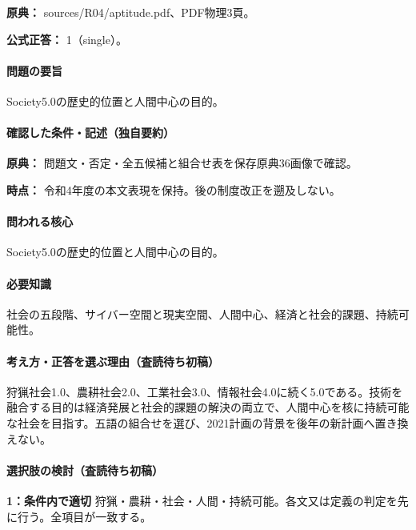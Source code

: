 \noindent\textbf{原典：} sources/R04/aptitude.pdf、PDF物理3頁。

\textbf{公式正答：} 1（single）。

\paragraph{問題の要旨} Society5.0の歴史的位置と人間中心の目的。

\paragraph{確認した条件・記述（独自要約）}\mbox{}\par

\noindent\textbf{原典：} 問題文・否定・全五候補と組合せ表を保存原典36画像で確認。\par

\noindent\textbf{時点：} 令和4年度の本文表現を保持。後の制度改正を遡及しない。\par

\paragraph{問われる核心} Society5.0の歴史的位置と人間中心の目的。

\paragraph{必要知識} 社会の五段階、サイバー空間と現実空間、人間中心、経済と社会的課題、持続可能性。

\paragraph{考え方・正答を選ぶ理由（査読待ち初稿）} 狩猟社会1.0、農耕社会2.0、工業社会3.0、情報社会4.0に続く5.0である。技術を融合する目的は経済発展と社会的課題の解決の両立で、人間中心を核に持続可能な社会を目指す。五語の組合せを選び、2021計画の背景を後年の新計画へ置き換えない。

\paragraph{選択肢の検討（査読待ち初稿）}\mbox{}\par

\noindent\textbf{1：条件内で適切} 狩猟・農耕・社会・人間・持続可能。各文又は定義の判定を先に行う。全項目が一致する。\par

